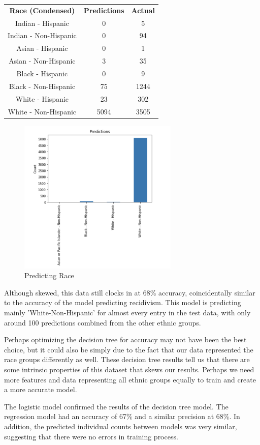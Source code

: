 \documentclass[11pt, sigconf]{acmart}
\begin{document}
\begin{tabular}{|c|c|c|}
\textbf{Race (Condensed)} & \textbf{Predictions} & \textbf{Actual} \\
 Indian  - Hispanic& 0 & 5 \\
Indian - Non-Hispanic& 0 & 94 \\
 Asian - Hispanic& 0 & 1\\
 Asian  - Non-Hispanic& 3 & 35\\
 Black - Hispanic&0 & 9 \\
 Black - Non-Hispanic& 75 &1244\\ 
 White - Hispanic& 23& 302 \\
 White - Non-Hispanic &5094&3505\\
\end{tabular}

\begin{figure}[h] 	
\centering
\includegraphics[width=3in]{4.png}
\caption{Predicting Race}
\end{figure}

Although skewed, this data still clocks in at 68\% accuracy, coincidentally similar to the accuracy of the model predicting recidivism. 
This model is predicting mainly 'White-Non-Hispanic' for almost every entry in the test data, with only around 100 predictions combined from the other ethnic groups. 

Perhaps optimizing the decision tree for accuracy may not have been the best choice, but it could also be simply due to the fact that our data represented the race groups differently as well. These decision tree results tell us that there are some intrinsic properties of this dataset that skews our results. Perhaps we need more features and data representing all ethnic groups equally to train and create a more accurate model. 

The logistic model confirmed the results of the decision tree model. The regression model had an accuracy of 67\% and a similar precision at 68\%. In addition, the predicted individual counts between models was very similar, suggesting that there were no errors in training process. 
\end{document}
